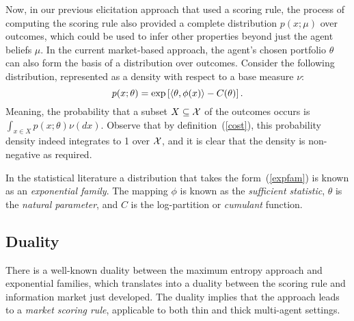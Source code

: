 Now, in our previous elicitation approach that used a scoring rule, the process of computing the scoring rule also provided a complete distribution $p(x;\mu)$ over outcomes, which could be used to infer other properties beyond just the agent beliefs $\mu$. In the current market-based approach, the agent's chosen portfolio $\theta$ can also form the basis of a distribution over outcomes. Consider the following distribution, represented as a density with respect to a base measure $\nu$:
%
\begin{equation} \label{expfam}
p(x;\theta) = \exp\left[ \langle \theta, \phi(x) \rangle - C(\theta) \right].
\end{equation}
%
Meaning, the probability that a subset $X \subseteq \mathcal{X}$ of the outcomes occurs is $\int_{x \in X} p(x;\theta)\nu(dx)$. Observe that by definition~(\ref{cost}), this probability density indeed integrates to 1 over $\mathcal{X}$, and it is clear that the density is non-negative as required.  

In the statistical literature a distribution that takes the form~(\ref{expfam}) is known as an \emph{exponential family}. The mapping $\phi$ is known as the \emph{sufficient statistic}, $\theta$ is the \emph{natural parameter}, and $C$ is the log-partition or \emph{cumulant} function. %



\subsection{Duality}

There is a well-known duality between the maximum entropy approach and exponential families, which translates into a duality between the scoring rule and information market just developed. The duality implies that the approach leads to a \emph{market scoring rule}, applicable to both thin and thick multi-agent settings.


